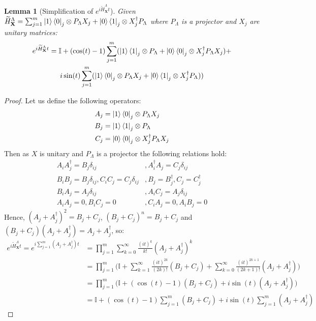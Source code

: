 \documentclass[10pt]{amsart}
\newtheorem{lemma}{Lemma}
\newcommand{\X}{\textbf{X}}
\begin{document}
\begin{appendix}
\begin{lemma}[Simplification of $e^{i\widetilde{H}^{\Lambda}_{\X}t} $]
\label{lemma_simplify_h}
Given $\widetilde{H}^{\Lambda}_{\X} = \sum_{j=1}^m \ket{1}\bra{0}_j \otimes P_{\Lambda}X_j + \ket{0}\bra{1}_j \otimes X_j^{\dagger} P_{\Lambda}$ where $P_{\Lambda}$ is a projector and $X_j$ are unitary matrices:
    \begin{multline*}
        e^{i\widetilde{H}^{\Lambda}_{\X}t} = \mathbb{I} + (\cos(t) -1)\sum_{j=1}^m (\ket{1}\bra{1}_j\otimes P_{\Lambda}+\ket{0}\bra{0}_j\otimes X_j^{\dagger}P_{\Lambda} X_j) +\\ i\sin(t)\sum_{j=1}^m(\ket{1}\bra{0}_j \otimes P_{\Lambda} X_j+\ket{0}\bra{1}_j \otimes  X_j^{\dagger}P_{\Lambda}))
    \end{multline*}
\end{lemma}
\begin{proof}
    Let us define the following operators:
    \begin{align*}
        A_j &= \ket{1}\bra{0}_j \otimes P_{\Lambda} X_j\\
        B_j &= \ket{1}\bra{1}_j\otimes P_{\Lambda}\\
        C_j &= \ket{0}\bra{0}_j\otimes X_j^{\dagger}P_{\Lambda} X_j
    \end{align*}
    Then as $X$ is unitary and $P_{\Lambda}$ is a projector the following relations hold:
    \begin{align*}
        A_iA_j^{\dagger} = B_j\delta_{ij}&, A_i^{\dagger}A_j = C_j\delta_{ij}\\
        B_iB_j = B_j\delta_{ij}, C_iC_j = C_j\delta_{ij}&, B_j= B_j^{\dagger}, C_j=C_j^{\dagger} \\
        B_iA_j = A_j\delta_{ij}&, A_iC_j = A_j\delta_{ij} \\
        A_iA_j = 0, B_iC_j = 0&,C_iA_j= 0, A_iB_j = 0
    \end{align*}
    Hence, $(A_j+A_j^{\dagger})^2 = B_j+C_j$, $(B_j+C_j)^n = B_j+C_j$ and $(B_j+C_j)(A_j+A_j^{\dagger}) = A_j+A_j^{\dagger}$, so:
    \begin{align}
    e^{i\widetilde{H}^{\Lambda}_{\X}t} = e^{i\sum_{j=1}^m(A_j+A_j^{\dagger})t} &= \prod_{j=1}^m\sum_{k=0}^{\infty} \frac{(it)^k}{k!} (A_j+A_j^{\dagger})^k \\
    &= \prod_{j=1}^m\bigg(\mathbb{I} + \sum_{k=1}^{\infty}\frac{(it)^{2k}}{(2k)!} (B_j+C_j) + \sum_{k=0}^{\infty}\frac{(it)^{2k+1}}{(2k+1)!} (A_j+A_j^{\dagger})\bigg)\\
    &= \prod_{j=1}^m\bigg(\mathbb{I} + (\cos(t) -1) (B_j+C_j) + i\sin(t)(A_j+A_j^{\dagger})\bigg)\\
    &= \mathbb{I} + (\cos(t) -1)\sum_{j=1}^m (B_j+C_j) + i\sin(t)\sum_{j=1}^m(A_j+A_j^{\dagger})
    \end{align}
\end{proof}
\end{appendix}
\end{document}
